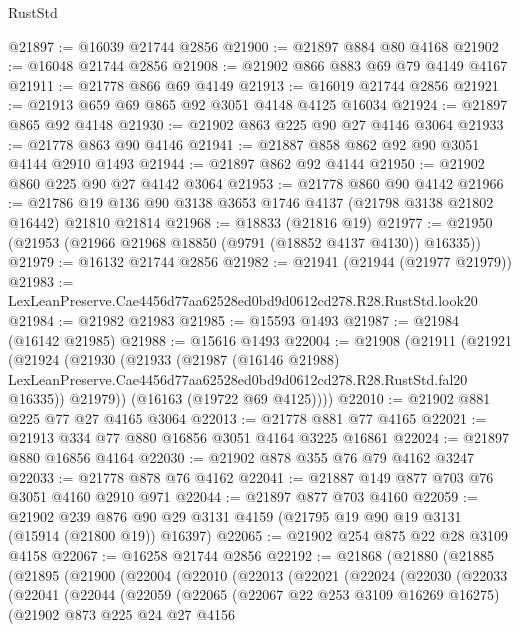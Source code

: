 \begin{lexlean}{RustStd}
\begin{coremodule}
@21897 := @16039 @21744 @2856
@21900 := @21897 @884 @80 @4168
@21902 := @16048 @21744 @2856
@21908 := @21902 @866 @883 @69 @79 @4149 @4167
@21911 := @21778 @866 @69 @4149
@21913 := @16019 @21744 @2856
@21921 := @21913 @659 @69 @865 @92 @3051 @4148 @4125 @16034
@21924 := @21897 @865 @92 @4148
@21930 := @21902 @863 @225 @90 @27 @4146 @3064
@21933 := @21778 @863 @90 @4146
@21941 := @21887 @858 @862 @92 @90 @3051 @4144 @2910 @1493
@21944 := @21897 @862 @92 @4144
@21950 := @21902 @860 @225 @90 @27 @4142 @3064
@21953 := @21778 @860 @90 @4142
@21966 := @21786 @19 @136 @90 @3138 @3653 @1746 @4137 (@21798 @3138 @21802 @16442) @21810 @21814
@21968 := @18833 (@21816 @19)
@21977 := @21950 (@21953 (@21966 @21968 @18850 (@9791 (@18852 @4137 @4130)) @16335))
@21979 := @16132 @21744 @2856
@21982 := @21941 (@21944 (@21977 @21979))
@21983 := LexLeanPreserve.Cae4456d77aa62528ed0bd9d0612cd278.R28.RustStd.look20
@21984 := @21982 @21983
@21985 := @15593 @1493
@21987 := @21984 (@16142 @21985)
@21988 := @15616 @1493
@22004 := @21908
    (@21911
      (@21921
        (@21924
          (@21930
            (@21933
              (@21987
                (@16146 @21988)
                LexLeanPreserve.Cae4456d77aa62528ed0bd9d0612cd278.R28.RustStd.fal20
                @16335))
            @21979))
        (@16163 (@19722 @69 @4125))))
@22010 := @21902 @881 @225 @77 @27 @4165 @3064
@22013 := @21778 @881 @77 @4165
@22021 := @21913 @334 @77 @880 @16856 @3051 @4164 @3225 @16861
@22024 := @21897 @880 @16856 @4164
@22030 := @21902 @878 @355 @76 @79 @4162 @3247
@22033 := @21778 @878 @76 @4162
@22041 := @21887 @149 @877 @703 @76 @3051 @4160 @2910 @971
@22044 := @21897 @877 @703 @4160
@22059 := @21902
    @239
    @876
    @90
    @29
    @3131
    @4159
    (@21795 @19 @90 @19 @3131 (@15914 (@21800 @19)) @16397)
@22065 := @21902 @254 @875 @22 @28 @3109 @4158
@22067 := @16258 @21744 @2856
@22192 := @21868
    (@21880
      (@21885
        (@21895
          (@21900
            (@22004
              (@22010
                (@22013
                  (@22021
                    (@22024
                      (@22030
                        (@22033
                          (@22041
                            (@22044
                              (@22059
                                (@22065
                                  (@22067 @22 @253 @3109 @16269 @16275)
                                  (@21902
                                    @873
                                    @225
                                    @24
                                    @27
                                    @4156

\end{coremodule}
\end{lexlean}
